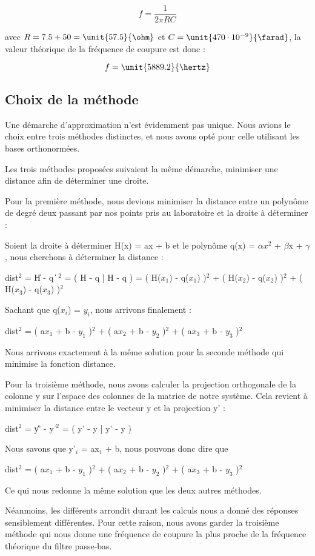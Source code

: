 $$f=\frac{1}{2\pi RC}$$

avec $R= 7.5 + 50 = \unit{57.5}{\ohm}$ et $C= \unit{470 \cdot 10^{-9}}{\farad}$, la valeur théorique de
la fréquence de coupure est donc :

$$f= \unit{5889.2}{\hertz}$$


\subsection{Choix de la méthode}

Une démarche d'approximation n'est évidemment pas unique. Nous avions le choix entre trois méthodes
distinctes, et nous avons opté pour celle utilisant les bases orthonormées.

Les trois méthodes proposées suivaient la même démarche, minimiser une distance afin de déterminer une droite. 

Pour la première méthode,  nous devions minimiser la distance entre un polynôme de degré deux passant par nos points pris au laboratoire et la droite à déterminer :

Soient la droite à déterminer H(x) = ax + b et le polynôme q(x) = $\alpha x^2$ + $\beta$x + $\gamma$, nous cherchons à déterminer la distance :

dist$^2$ = \| H - q \| $^2$ = ( H - q | H - q ) = ( H($x_1$) - q($x_1$) )$^2$ + ( H($x_2$) - q($x_2$) )$^2$ + ( H($x_3$) - q($x_3$) )$^2$

Sachant que q($x_i$) = $y_i$, nous arrivons finalement :

dist$^2$ = ( a$x_1$ + b - $y_1$ )$^2$ + ( a$x_2$ + b - $y_2$ )$^2$ + ( a$x_3$ + b - $y_3$ )$^2$

Nous arrivons exactement à la même solution pour la seconde méthode qui minimise la fonction distance. 

Pour la troisième méthode, nous avons calculer la projection orthogonale de la colonne y sur l'espace  des colonnes de la matrice de notre système. Cela revient à minimiser la distance entre le vecteur y et la projection y' :

dist$^2$ = \| y' - y \|$^2$ = ( y' - y | y' - y )

Nous savons que y'$_i$ = ax$_1$ + b, nous pouvons donc dire que  

dist$^2$ = ( a$x_1$ + b - $y_1$ )$^2$ + ( a$x_2$ + b - $y_2$ )$^2$ + ( a$x_3$ + b - $y_3$ )$^2$

Ce qui nous redonne la même solution que les deux autres méthodes. 

Néanmoins, les différents arrondit durant les calculs nous a donné des réponses sensiblement différentes. Pour cette raison, nous avons garder la troisième méthode qui nous donne une fréquence de coupure la plus proche de la fréquence théorique du filtre passe-bas.
 

